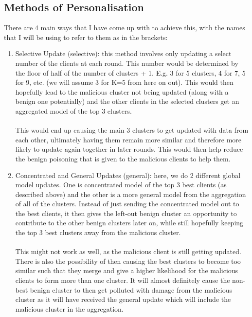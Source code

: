 \subsection{Methods of Personalisation}
There are 4 main ways that I have come up with to achieve this, with the names that I will be using to refer to them as in the brackets:
\begin{enumerate}
    \item Selective Update (selective): this method involves only updating a select number of the clients at each round. This number would be determined by the floor of half of the number of clusters + 1. E.g. 3 for 5 clusters, 4 for 7, 5 for 9, etc. (we will assume 3 for K=5 from here on out).
    This would then hopefully lead to the malicious cluster not being updated (along with a benign one potentially) and the other clients in the selected clusters get an aggregated model of the top 3 clusters.
    \\ \\
    This would end up causing the main 3 clusters to get updated with data from each other, ultimately having them remain more similar and therefore more likely to update again together in later rounds.
    This would then help reduce the benign poisoning that is given to the malicious clients to help them.
    
    \item Concentrated and General Updates (general): here, we do 2 different global model updates.
    One is concentrated model of the top 3 best clients (as described above) and the other is a more general model from the aggregation of all of the clusters.
    Instead of just sending the concentrated model out to the best clients, it then gives the left-out benign cluster an opportunity to contribute to the other benign clusters later on, while still hopefully keeping the top 3 best clusters away from the malicious cluster.
    \\ \\
    This might not work as well, as the malicious client is still getting updated.
    There is also the possibility of then causing the best clusters to become too similar such that they merge and give a higher likelihood for the malicious clients to form more than one cluster.
    It will almost definitely cause the non-best benign cluster to then get polluted with damage from the malicious cluster as it will have received the general update which will include the malicious cluster in the aggregation.
    

\end{enumerate}
